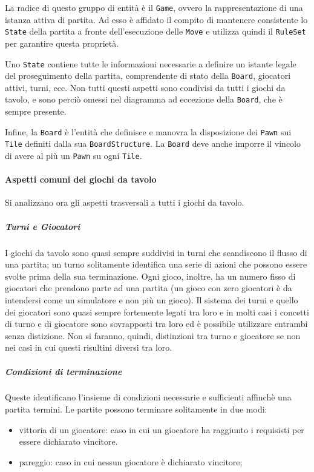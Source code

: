 La radice di questo gruppo di entità è il \texttt{Game}, ovvero la rappresentazione di una istanza attiva di partita.
%
Ad esso è affidato il compito di mantenere consistente lo \texttt{State} della partita a fronte dell'esecuzione delle \texttt{Move} e utilizza quindi il \texttt{RuleSet} per garantire questa proprietà.

Uno \texttt{State} contiene tutte le informazioni necessarie a definire un istante legale del proseguimento della partita, comprendente di stato della \texttt{Board}, giocatori attivi, turni, ecc.
%
Non tutti questi aspetti sono condivisi da tutti i giochi da tavolo, e sono perciò omessi nel diagramma ad eccezione della \texttt{Board}, che è sempre presente.

Infine, la \texttt{Board} è l'entità che definisce e manovra la disposizione dei \texttt{Pawn} sui \texttt{Tile} definiti dalla sua \texttt{BoardStructure}.
%
La \texttt{Board} deve anche imporre il vincolo di avere al più un \texttt{Pawn} su ogni \texttt{Tile}.

\paragraph{Aspetti comuni dei giochi da tavolo}
%
Si analizzano ora gli aspetti trasversali a tutti i giochi da tavolo.
%
\subparagraph{Turni e Giocatori}
%
I giochi da tavolo sono quasi sempre suddivisi in turni che scandiscono il flusso di una partita; un turno solitamente identifica una serie di azioni che possono essere svolte prima della sua terminazione.
%
Ogni gioco, inoltre, ha un numero fisso di giocatori che prendono parte ad una partita (un gioco con zero giocatori è da intendersi come un simulatore e non più un gioco).
%
Il sistema dei turni e quello dei giocatori sono quasi sempre fortemente legati tra loro e in molti casi i concetti di turno e di giocatore sono sovrapposti tra loro ed è possibile utilizzare entrambi senza distizione.
%
Non si faranno, quindi, distinzioni tra turno e giocatore se non nei casi in cui questi risultini diversi tra loro.
%
\subparagraph{Condizioni di terminazione}
%
Queste identificano l'insieme di condizioni necessarie e sufficienti affinchè una partita termini.
%
Le partite possono terminare solitamente in due modi:
\begin{itemize}
  \item vittoria di un giocatore: caso in cui un giocatore ha raggiunto i requisisti per essere dichiarato vincitore.
  \item pareggio: caso in cui nessun giocatore è dichiarato vincitore;
\end{itemize}


